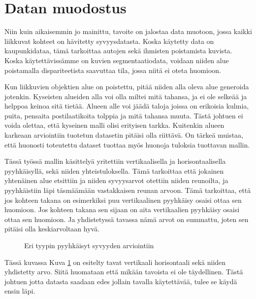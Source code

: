 \section{Datan muodostus}

Niin kuin aikaisemmin jo mainittu, tavoite on jalostaa data muotoon, jossa kaikki liikkuvat kohteet on hävitetty syvyysdatasta.
Koska käytetty data on kaupunkidataa, tämä tarkoittaa autojen sekä ihmisten poistamista kuvista.
Koska käytettävissämme on kuvien segmentaatiodata, voidaan niiden alue poistamalla dispariteetista saavuttaa tila, jossa niitä ei oteta huomioon.

Kun liikkuvien objektien alue on poistettu, pitää niiden alla oleva alue generoida jotenkin. 
Kyseisten alueiden alla voi olla miltei mitä tahansa, 
ja ei ole selkeää ja helppoa keinoa sitä tietää. 
Alueen alle voi jäädä taloja joissa on erikoisia kulmia, puita, pensaita postilaatikoita tolppia ja mitä tahansa muuta. 
Tästä johtuen ei voida olettaa, että kyseinen malli olisi erityisen tarkka.
Kuitenkin alueen karkeaan arviointiin tuotetun datasetin pitäisi olla riittävä.
On tärkeä muistaa, että huonosti toteutettu dataset tuottaa myös huonoja tuloksia tuottavan mallin.

Tässä työssä mallin käsittelyä yritettiin vertikaalisella ja horisontaalisella pyyhkäisyllä, sekä niiden yhteistuloksella.
Tämä tarkoittaa että jokainen yhtenäinen alue etsittiin ja niiden syvyysarvot otettiin niiden reunoilta,
ja pyyhkäistiin läpi täsmäämään vastakkaisen reunan arvoon.
Tämä tarkoittaa, että jos kohteen takana on esimerkiksi puu vertikaalinen pyyhkäisy osaisi ottaa sen huomioon.
Jos kohteen takana sen sijaan on aita vertikaalien pyyhkäisy osaisi ottaa sen huomioon.
Ja yhdistetyssä tavassa nämä arvot on summattu, joten sen pitäisi olla keskiarvoltaan hyvä. 

\begin{figure}[h]
\centering
{}
\caption{Eri tyypin pyyhkäisyt syvyyden arviointiin}
\label{fig:swipe}
\end{figure}


Tässä kuvassa Kuva \ref{fig:swipe} on esitelty tavat vertikaali horisontaali sekä niiden yhdistetty arvo. 
Siitä huomataan että mikään tavoista ei ole täydellinen.
Tästä johtuen jotta datasta saadaan edes jollain tavalla käytettävää, tulee se käydä ensin läpi. 

